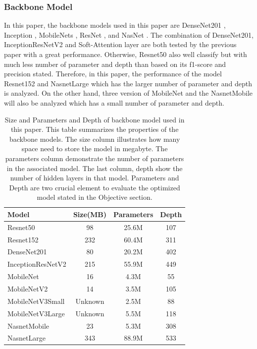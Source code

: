 \documentclass[sensors,article,submit,pdftex,moreauthors]{Definitions/mdpi}
\begin{document}
\subsubsection{Backbone Model}
In this paper, the backbone models used in this paper are DenseNet201 \cite{06993}, Inception \cite{00567}, MobileNets \cite{04861} \cite{04381} \cite{02244}, ResNet \cite{03385} \cite{05027}, and NasNet \cite{07012}. The combination of DenseNet201, InceptionResNetV2 and Soft-Attention layer are both tested by the previous paper \cite{03358} with a great performance. Otherwise, Resnet50 also well classify but with much less number of parameter and depth than based on its f1-score and precision stated. Therefore, in this paper, the performance of the model Resnet152 and NasnetLarge which has the larger number of parameter and depth is analyzed. On the other hand, three version of MobileNet and the NasnetMobile will also be analyzed which has a small number of parameter and depth.  

\begin{table}[H]
	\centering
	\begin{tabular}{|l | c c c|} 
		\hline
		Model & Size(MB) & Parameters & Depth \\ 
		\hline
		Resnet50 & 98 & 25.6M & 107 \\ 
		\hline
		Resnet152 & 232 & 60.4M & 311 \\ 
		\hline
		DenseNet201 & 80 & 20.2M & 402 \\
		\hline
		InceptionResNetV2 & 215 & 55.9M & 449 \\
		\hline
		MobileNet & 16 & 4.3M & 55 \\ 
		\hline
		MobileNetV2 & 14 & 3.5M & 105 \\ 
		\hline
		MobileNetV3Small & Unknown & 2.5M & 88 \\ 
		\hline
		MobileNetV3Large & Unknown & 5.5M & 118 \\
		\hline
		NasnetMobile & 23 & 5.3M & 308 \\
		\hline
		NasnetLarge & 343 & 88.9M & 533 \\ 
		\hline
	\end{tabular}
	\caption{Size and Parameters and Depth of backbone model used in this paper. This table summarizes the properties of the backbone models. The size column illustrates how many space need to store the model in megabyte. The parameters column demonstrate the number of parameters in the associated model. The last column, depth show the number of hidden layers in that model. Parameters and Depth are two crucial element to evaluate the optimized model stated in the Objective section.}
	\label{table:model-summary}
\end{table}
\end{document}
